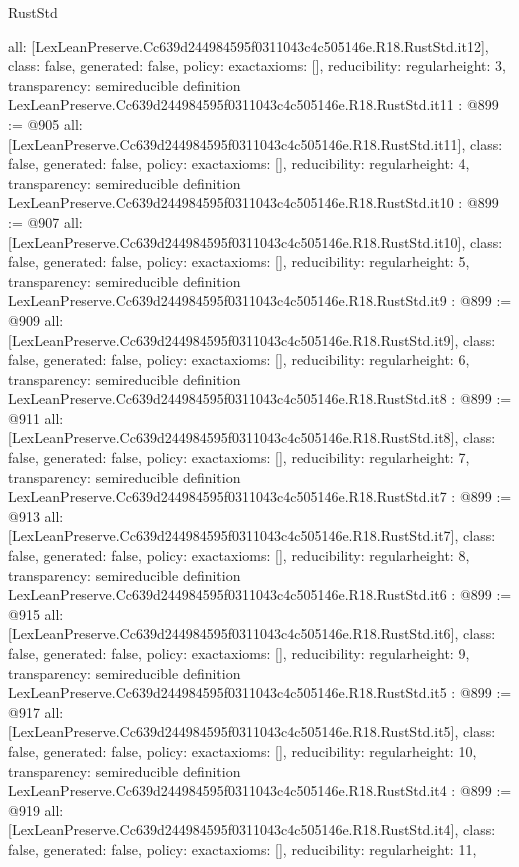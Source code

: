 \begin{lexlean}{RustStd}
\begin{coremodule}
{  all: [LexLeanPreserve.Cc639d244984595f0311043c4c505146e.R18.RustStd.it12],
  class: false,
  generated: false,
  policy: exact{axioms: []},
  reducibility: regular{height: 3},
  transparency: semireducible
}
definition LexLeanPreserve.Cc639d244984595f0311043c4c505146e.R18.RustStd.it11 : @899 := @905 {
  all: [LexLeanPreserve.Cc639d244984595f0311043c4c505146e.R18.RustStd.it11],
  class: false,
  generated: false,
  policy: exact{axioms: []},
  reducibility: regular{height: 4},
  transparency: semireducible
}
definition LexLeanPreserve.Cc639d244984595f0311043c4c505146e.R18.RustStd.it10 : @899 := @907 {
  all: [LexLeanPreserve.Cc639d244984595f0311043c4c505146e.R18.RustStd.it10],
  class: false,
  generated: false,
  policy: exact{axioms: []},
  reducibility: regular{height: 5},
  transparency: semireducible
}
definition LexLeanPreserve.Cc639d244984595f0311043c4c505146e.R18.RustStd.it9 : @899 := @909 {
  all: [LexLeanPreserve.Cc639d244984595f0311043c4c505146e.R18.RustStd.it9],
  class: false,
  generated: false,
  policy: exact{axioms: []},
  reducibility: regular{height: 6},
  transparency: semireducible
}
definition LexLeanPreserve.Cc639d244984595f0311043c4c505146e.R18.RustStd.it8 : @899 := @911 {
  all: [LexLeanPreserve.Cc639d244984595f0311043c4c505146e.R18.RustStd.it8],
  class: false,
  generated: false,
  policy: exact{axioms: []},
  reducibility: regular{height: 7},
  transparency: semireducible
}
definition LexLeanPreserve.Cc639d244984595f0311043c4c505146e.R18.RustStd.it7 : @899 := @913 {
  all: [LexLeanPreserve.Cc639d244984595f0311043c4c505146e.R18.RustStd.it7],
  class: false,
  generated: false,
  policy: exact{axioms: []},
  reducibility: regular{height: 8},
  transparency: semireducible
}
definition LexLeanPreserve.Cc639d244984595f0311043c4c505146e.R18.RustStd.it6 : @899 := @915 {
  all: [LexLeanPreserve.Cc639d244984595f0311043c4c505146e.R18.RustStd.it6],
  class: false,
  generated: false,
  policy: exact{axioms: []},
  reducibility: regular{height: 9},
  transparency: semireducible
}
definition LexLeanPreserve.Cc639d244984595f0311043c4c505146e.R18.RustStd.it5 : @899 := @917 {
  all: [LexLeanPreserve.Cc639d244984595f0311043c4c505146e.R18.RustStd.it5],
  class: false,
  generated: false,
  policy: exact{axioms: []},
  reducibility: regular{height: 10},
  transparency: semireducible
}
definition LexLeanPreserve.Cc639d244984595f0311043c4c505146e.R18.RustStd.it4 : @899 := @919 {
  all: [LexLeanPreserve.Cc639d244984595f0311043c4c505146e.R18.RustStd.it4],
  class: false,
  generated: false,
  policy: exact{axioms: []},
  reducibility: regular{height: 11},
}
\end{coremodule}
\end{lexlean}
